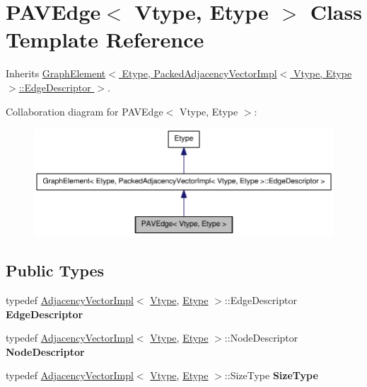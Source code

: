 \hypertarget{class_p_a_v_edge}{
\section{PAVEdge$<$ Vtype, Etype $>$ Class Template Reference}
\label{class_p_a_v_edge}
}


Inherits \hyperlink{class_graph_element}{GraphElement$<$ Etype, PackedAdjacencyVectorImpl$<$ Vtype, Etype $>$::EdgeDescriptor $>$}.



Collaboration diagram for PAVEdge$<$ Vtype, Etype $>$:\nopagebreak
\begin{figure}[H]
\begin{center}
\leavevmode
\includegraphics[width=400pt]{class_p_a_v_edge__coll__graph}
\end{center}
\end{figure}
\subsection*{Public Types}
\begin{DoxyCompactItemize}
\item 
\hypertarget{class_p_a_v_edge_a93b9d269f59bc9f188c7e3e5f5cf9e5e}{
typedef \hyperlink{class_adjacency_vector_impl}{AdjacencyVectorImpl}$<$ \hyperlink{class_vtype}{Vtype}, \hyperlink{class_etype}{Etype} $>$::EdgeDescriptor {\bfseries EdgeDescriptor}}
\label{class_p_a_v_edge_a93b9d269f59bc9f188c7e3e5f5cf9e5e}

\item 
\hypertarget{class_p_a_v_edge_ac4ffa11dbca580c9ccf7ce43c4294fdd}{
typedef \hyperlink{class_adjacency_vector_impl}{AdjacencyVectorImpl}$<$ \hyperlink{class_vtype}{Vtype}, \hyperlink{class_etype}{Etype} $>$::NodeDescriptor {\bfseries NodeDescriptor}}
\label{class_p_a_v_edge_ac4ffa11dbca580c9ccf7ce43c4294fdd}

\item 
\hypertarget{class_p_a_v_edge_a3bc990f8dcf1b663f1d90f37dc026641}{
typedef \hyperlink{class_adjacency_vector_impl}{AdjacencyVectorImpl}$<$ \hyperlink{class_vtype}{Vtype}, \hyperlink{class_etype}{Etype} $>$::SizeType {\bfseries SizeType}}
\label{class_p_a_v_edge_a3bc990f8dcf1b663f1d90f37dc026641}

\end{DoxyCompactItemize}
